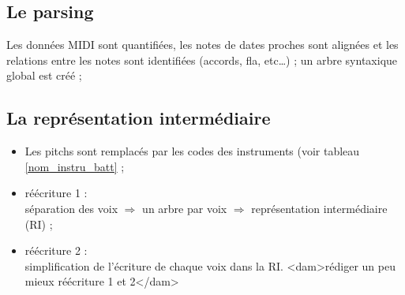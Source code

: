 %
%
%
%
%

\subsection*{Le parsing}
Les données MIDI sont quantifiées, les notes de dates proches sont alignées et
les relations entre les notes sont identifiées (accords, fla, etc…) ; un arbre
syntaxique global est créé ;

\subsection*{La représentation intermédiaire}
\begin{itemize}
    \item Les pitchs sont remplacés par les codes des instruments (voir tableau
    \ref{nom_instru_batt} ;
    \item réécriture 1 :\\
    séparation des voix $\Rightarrow$ un arbre par voix
    $\Rightarrow$ représentation intermédiaire (RI) ;
    \item réécriture 2 :\\
    simplification de l’écriture de chaque voix dans la RI.
    <dam>rédiger un peu mieux réécriture 1 et 2</dam>
\end{itemize}

